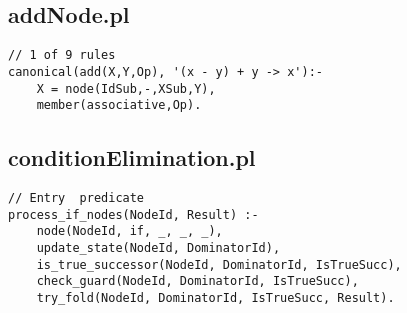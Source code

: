 \subsection{addNode.pl}
\begin{lstlisting}
// 1 of 9 rules
canonical(add(X,Y,Op), '(x - y) + y -> x'):-
    X = node(IdSub,-,XSub,Y),
    member(associative,Op).
\end{lstlisting}
\label{appendix:addNode.pl}
    
\subsection{conditionElimination.pl}
\begin{lstlisting}
// Entry  predicate
process_if_nodes(NodeId, Result) :-
    node(NodeId, if, _, _, _),
    update_state(NodeId, DominatorId),
    is_true_successor(NodeId, DominatorId, IsTrueSucc),
    check_guard(NodeId, DominatorId, IsTrueSucc),
    try_fold(NodeId, DominatorId, IsTrueSucc, Result).
\end{lstlisting}
\label{appendix:conditionElimination.pl}